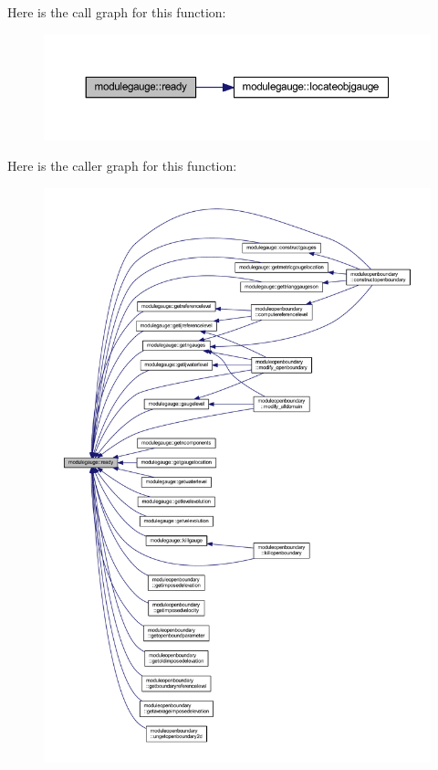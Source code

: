 Here is the call graph for this function\+:\nopagebreak
\begin{figure}[H]
\begin{center}
\leavevmode
\includegraphics[width=350pt]{namespacemodulegauge_a8ece20a220d6beae6919846687d6fe8f_cgraph}
\end{center}
\end{figure}
Here is the caller graph for this function\+:\nopagebreak
\begin{figure}[H]
\begin{center}
\leavevmode
\includegraphics[width=350pt]{namespacemodulegauge_a8ece20a220d6beae6919846687d6fe8f_icgraph}
\end{center}
\end{figure}
\mbox{\label{namespacemodulegauge_a758cb1de5348d750b81f0adbb711363f}} 
